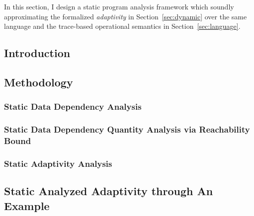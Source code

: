 In this section, I design a static program analysis framework which soundly approximating the formalized 
\emph{adaptivity} in Section~\ref{sec:dynamic} 
over the same language and the trace-based operational semantics in Section~\ref{sec:language}.
\subsection{Introduction}
\label{subsec:static-intro}


\subsection{Methodology}
\label{subsec:static-methodology}



\subsubsection{Static Data Dependency Analysis}
\label{subsubsec:static-datadep}


\subsubsection{Static Data Dependency Quantity Analysis via Reachability Bound}
\label{subsubsec:static-reachability}


\subsubsection{Static Adaptivity Analysis}
\label{subsubsec:static-adapt}


\subsection{Static Analyzed Adaptivity through An Example}
\label{subsec:static-examples}
% 

%
